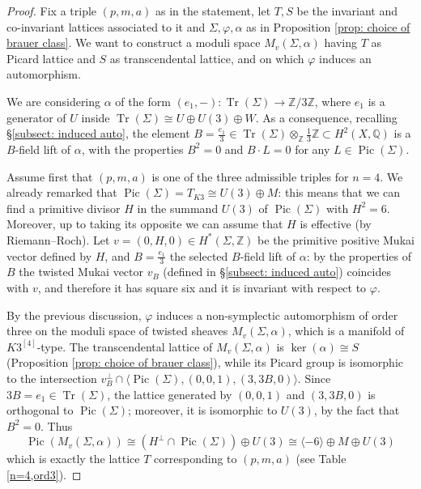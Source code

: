 \documentclass{amsart}
\theoremstyle{definition}
\newcommand{\ra}{\rightarrow}
\newcommand{\IZ}{\mathbb{Z}}
\newcommand{\IQ}{\mathbb{Q}}
\newcommand{\hskq}{K3^{\left[4\right]}}
\DeclareMathOperator{\pic}{Pic}
\DeclareMathOperator{\trans}{Tr}
\begin{document}
\begin{proof}
Fix a triple $(p,m,a)$ as in the statement, let $T,S$ be the invariant and co-invariant lattices associated to it and $\Sigma, \varphi, \alpha$ as in Proposition \ref{prop: choice of brauer class}. We want to construct a moduli space $M_v(\Sigma, \alpha)$ having $T$ as Picard lattice and $S$ as transcendental lattice, and on which $\varphi$ induces an automorphism. 

We are considering $\alpha$ of the form $(e_1, -): \trans(\Sigma) \ra \IZ/3 \IZ$, where $e_1$ is a generator of $U$ inside $\trans(\Sigma) \cong U \oplus U(3) \oplus W$. As a consequence, recalling \S \ref{subsect: induced auto}, the element $B = \frac{e_1}{3} \in \trans(\Sigma) \otimes_{\IZ} \frac{1}{3}\IZ \subset H^2(X, \IQ)$ is a $B$-field lift of $\alpha$, with the properties $B^2 = 0$ and $B \cdot L = 0$ for any $L \in \pic(\Sigma)$.

Assume first that $(p,m,a)$ is one of the three admissible triples for $n=4$. We already remarked that $\pic(\Sigma) = T_{K3} \cong U(3) \oplus M$: this means that we can find a primitive divisor $H$ in the summand $U(3)$ of $\pic(\Sigma)$ with $H^2 = 6$. Moreover, up to taking its opposite we can assume that $H$ is effective (by Riemann--Roch). Let $v = (0,H,0) \in H^*(\Sigma, \IZ)$ be the primitive positive Mukai vector defined by $H$, and $B = \frac{e_1}{3}$ the selected $B$-field lift of $\alpha$: by the properties of $B$ the twisted Mukai vector $v_B$ (defined in \S \ref{subsect: induced auto}) coincides with $v$, and therefore it has square six and it is invariant with respect to $\varphi$.

By the previous discussion, $\varphi$ induces a non-symplectic automorphism of order three on the moduli space of twisted sheaves $M_v(\Sigma, \alpha)$, which is a manifold of $\hskq$-type. The transcendental lattice of $M_v(\Sigma, \alpha)$ is $\ker(\alpha) \cong S$ (Proposition \ref{prop: choice of brauer class}), while its Picard group is isomorphic to the intersection $v_B^\perp \cap \langle \pic(\Sigma), (0,0,1), (3,3B, 0) \rangle$. Since $3B = e_1 \in \trans(\Sigma)$, the lattice generated by $(0,0,1)$ and $(3,3B, 0)$ is orthogonal to $\pic(\Sigma)$; moreover, it is isomorphic to $U(3)$, by the fact that $B^2 = 0$. Thus 
$$\pic\left(M_v(\Sigma, \alpha)\right) \cong \left( H^\perp \cap \pic(\Sigma) \right) \oplus U(3) \cong \langle -6 \rangle \oplus M \oplus U(3)$$
\noindent which is exactly the lattice $T$ corresponding to $(p,m,a)$ (see Table \ref{n=4,ord3}).


\end{proof}
\end{document}
